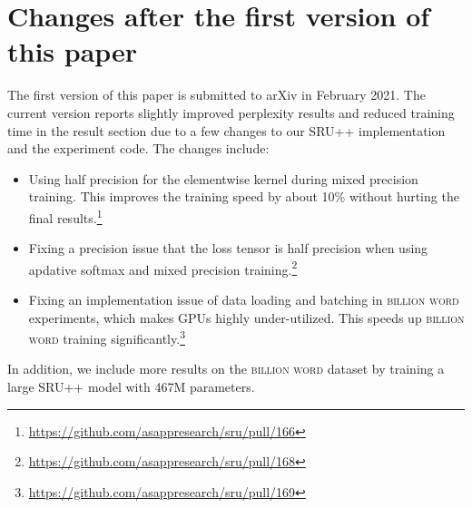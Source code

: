 \documentclass[11pt,a4paper]{article}
\begin{document}
\clearpage
\newpage
\appendix

\section{Changes after the first version of this paper}
\label{sec:appendix:changes_since_v1}
The first version of this paper is submitted to arXiv in February 2021.
The current version reports slightly improved perplexity results and reduced training time in the result section due to a few changes to our SRU++ implementation and the experiment code.
The changes include:
\begin{itemize}
    \item Using half precision for the elementwise kernel during mixed precision training. This improves the training speed by about 10\% without hurting the final results.\footnote{\url{https://github.com/asappresearch/sru/pull/166}}
    \item Fixing a precision issue that the loss tensor is half precision when using apdative softmax and mixed precision training.\footnote{\url{https://github.com/asappresearch/sru/pull/168}}
    \item Fixing an implementation issue of data loading and batching in \textsc{billion word} experiments, which makes GPUs highly under-utilized. This speeds up \textsc{billion word} training significantly.\footnote{\url{https://github.com/asappresearch/sru/pull/169}}
\end{itemize}
In addition, we include more results on the \textsc{billion word} dataset by training a large SRU++ model with 467M parameters.
\end{document}
